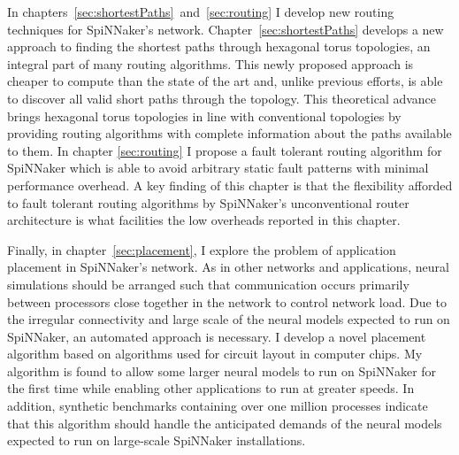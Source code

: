 In chapters~\ref{sec:shortestPaths}~and~\ref{sec:routing} I develop new routing
techniques for SpiNNaker's network. Chapter~\ref{sec:shortestPaths} develops a
new approach to finding the shortest paths through hexagonal torus topologies,
an integral part of many routing algorithms. This newly proposed approach is
cheaper to compute than the state of the art and, unlike previous efforts, is
able to discover all valid short paths through the topology. This theoretical
advance brings hexagonal torus topologies in line with conventional topologies
by providing routing algorithms with complete information about the paths
available to them. In chapter \ref{sec:routing} I propose a fault tolerant
routing algorithm for SpiNNaker which is able to avoid arbitrary static fault
patterns with minimal performance overhead. A key finding of this chapter is
that the flexibility afforded to fault tolerant routing algorithms by
SpiNNaker's unconventional router architecture is what facilities the low
overheads reported in this chapter.

Finally, in chapter~\ref{sec:placement}, I explore the problem of application
placement in SpiNNaker's network. As in other networks and applications, neural
simulations should be arranged such that communication occurs primarily between
processors close together in the network to control network load. Due to the
irregular connectivity and large scale of the neural models expected to run on
SpiNNaker, an automated approach is necessary. I develop a novel placement
algorithm based on algorithms used for circuit layout in computer chips. My
algorithm is found to allow some larger neural models to run on SpiNNaker for
the first time while enabling other applications to run at greater speeds. In
addition, synthetic benchmarks containing over one million processes indicate
that this algorithm should handle the anticipated demands of the neural models
expected to run on large-scale SpiNNaker installations.
